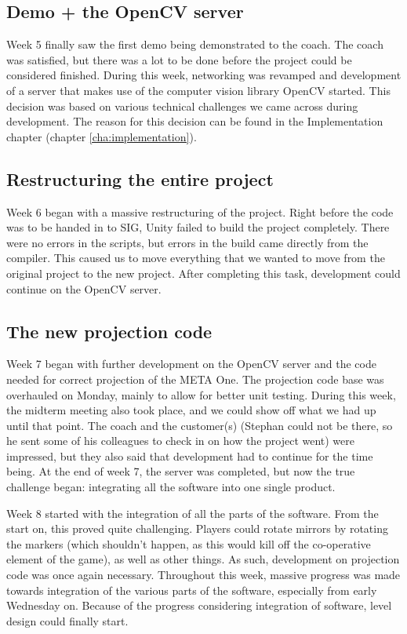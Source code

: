      \subsection{Demo + the OpenCV server} \label{ssec:firstdemo}
      Week 5 finally saw the first demo being demonstrated to the coach. The
      coach was satisfied, but there was a lot to be done before the project
      could be considered finished. During this week, networking was revamped
      and development of a server that makes use of the computer vision library
      OpenCV started. This decision was based on various technical challenges we 
      came across during development. The reason for this decision can be found 
      in the Implementation chapter (chapter \ref{cha:implementation}).
      
      \subsection{Restructuring the entire project}
      Week 6 began with a massive restructuring of the project. Right before
      the code was to be handed in to SIG, Unity failed to build the project
      completely. There were no errors in the scripts, but errors in the build
      came directly from the compiler. This caused us to move everything that
      we wanted to move from the original project to the new project. After
      completing this task, development could continue on the OpenCV server.
      
      \subsection{The new projection code}
      Week 7 began with further development on the OpenCV server and the code
      needed for correct projection of the META One. The projection code base
      was overhauled on Monday, mainly to allow for better unit testing. During
      this week, the midterm meeting also took place, and we could show off
      what we had up until that point. The coach and the customer(s) (Stephan
      could not be there, so he sent some of his colleagues to check in on
      how the project went) were impressed, but they also said that development
      had to continue for the time being. At the end of week 7, the server was
      completed, but now the true challenge began: integrating all the software
      into one single product.
      
      Week 8 started with the integration of all the parts of the software.
      From the start on, this proved quite challenging. Players could rotate
      mirrors by rotating the markers (which shouldn't happen, as this would
      kill off the co-operative element of the game), as well as other things.
      As such, development on projection code was once again necessary.
      Throughout this week, massive progress was made towards integration of 
      the various parts of the software, especially from early Wednesday on.
      Because of the progress considering integration of software, level design
      could finally start.
      
